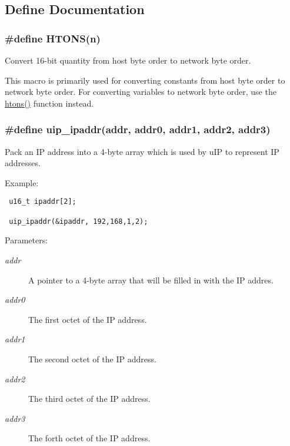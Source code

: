 \subsection{Define Documentation}
\hypertarget{a00065_g69a7a4951ff21b302267532c21ee78fc}{
\subsubsection[HTONS]{\setlength{\rightskip}{0pt plus 5cm}\#define HTONS(n)}}
\label{a00065_g69a7a4951ff21b302267532c21ee78fc}


Convert 16-bit quantity from host byte order to network byte order. 

This macro is primarily used for converting constants from host byte order to network byte order. For converting variables to network byte order, use the \hyperlink{a00065_ga22b04cac8cf283ca12f028578bebc06}{htons()} function instead. \hypertarget{a00065_g87f0b54ade0d159fba495089128a4932}{
\subsubsection[uip\_\-ipaddr]{\setlength{\rightskip}{0pt plus 5cm}\#define uip\_\-ipaddr(addr, addr0, addr1, addr2, addr3)}}
\label{a00065_g87f0b54ade0d159fba495089128a4932}


Pack an IP address into a 4-byte array which is used by u\-IP to represent IP addresses. 

Example: 

\footnotesize\begin{verbatim} u16_t ipaddr[2];

 uip_ipaddr(&ipaddr, 192,168,1,2); 
\end{verbatim}
\normalsize


\begin{Desc}
\item[Parameters:]
\begin{description}
\item[{\em addr}]A pointer to a 4-byte array that will be filled in with the IP addres. \item[{\em addr0}]The first octet of the IP address. \item[{\em addr1}]The second octet of the IP address. \item[{\em addr2}]The third octet of the IP address. \item[{\em addr3}]The forth octet of the IP address. \end{description}
\end{Desc}


